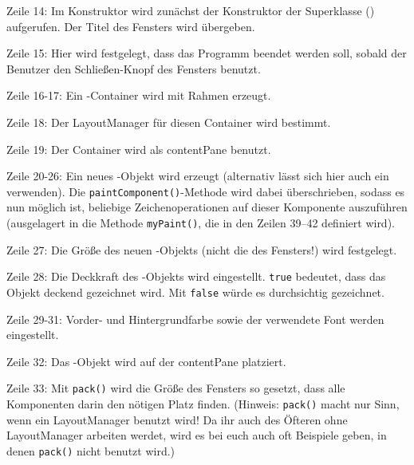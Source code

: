 \begin{compactitem}
\item[Zeile 14:] Im Konstruktor wird zunächst der Konstruktor der Superklasse
() aufgerufen. Der Titel des Fensters wird übergeben.

\item[Zeile 15:] Hier wird festgelegt, dass das Programm beendet werden soll,
sobald der Benutzer den Schließen-Knopf des Fensters benutzt.

\item[Zeile 16-17:] Ein -Container wird mit Rahmen erzeugt.

\item[Zeile 18:] Der LayoutManager für diesen Container wird bestimmt.

\item[Zeile 19:] Der Container wird als contentPane benutzt.

\item[Zeile 20-26:] Ein neues -Objekt wird erzeugt (alternativ
lässt sich hier auch ein  verwenden). Die
\lstinline|paintComponent()|-Methode wird dabei überschrieben, sodass es nun
möglich ist, beliebige Zeichenoperationen auf dieser Komponente auszuführen
(ausgelagert in die Methode \lstinline|myPaint()|, die in den Zeilen 39--42
definiert wird).

\item[Zeile 27:] Die Größe des neuen -Objekts (nicht die des
Fensters!) wird festgelegt.

\item[Zeile 28:] Die Deckkraft des -Objekts wird eingestellt.
\lstinline|true| bedeutet, dass das Objekt deckend gezeichnet wird. Mit
\lstinline|false| würde es durchsichtig gezeichnet.

\item[Zeile 29-31:] Vorder- und Hintergrundfarbe sowie der verwendete Font
werden eingestellt.

\item[Zeile 32:] Das -Objekt wird auf der contentPane platziert.

\item[Zeile 33:] Mit \lstinline|pack()| wird die Größe des Fensters so gesetzt,
dass alle Komponenten darin den nötigen Platz finden. (Hinweis:
\lstinline|pack()| macht nur Sinn, wenn ein LayoutManager benutzt wird! Da ihr
auch des Öfteren ohne LayoutManager arbeiten werdet, wird es bei euch auch oft
Beispiele geben, in denen \lstinline|pack()| nicht benutzt wird.)


\end{compactitem}

